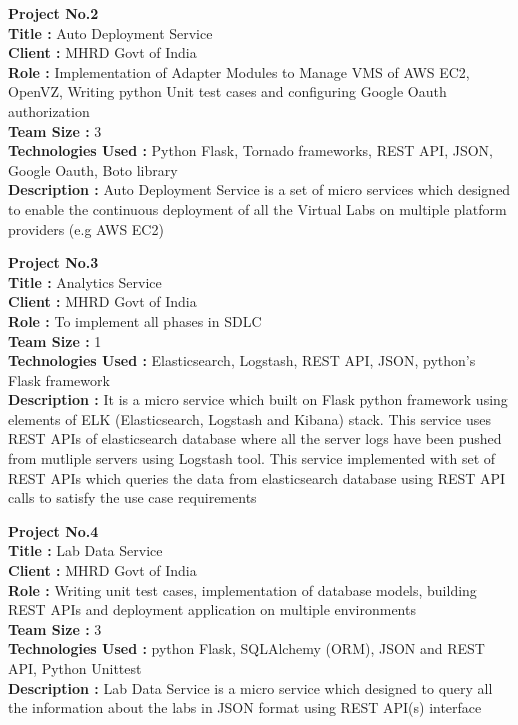 \documentclass{resume} %
\begin{document}
\bigskip

\textbf {Project No.2} \\
\textbf{Title : } Auto Deployment Service \\
\textbf{Client : } MHRD Govt of India \\
\textbf{Role : } Implementation of Adapter Modules to Manage
VMS of AWS EC2, OpenVZ, Writing python Unit test cases and
configuring Google Oauth authorization \\
\textbf{Team Size : } 3 \\
\textbf{Technologies Used :} Python Flask, Tornado
frameworks, REST API, JSON, Google Oauth, Boto library \\
\textbf{Description :} Auto Deployment Service is a set
of micro services which designed to enable the continuous
deployment of all the Virtual Labs on multiple platform
providers (e.g AWS EC2)



\bigskip

\textbf {Project No.3} \\
\textbf{Title : } Analytics Service \\
\textbf{Client : } MHRD Govt of India \\
\textbf{Role : } To implement all phases in SDLC  \\
\textbf{Team Size : } 1 \\
\textbf{Technologies Used :} Elasticsearch, Logstash, REST API, JSON, python's Flask
framework \\
\textbf{Description :} It is a
micro service which built on Flask python framework using
elements of ELK (Elasticsearch, Logstash and Kibana)
stack. This service uses REST APIs of elasticsearch database
where all the server logs have been pushed from mutliple
servers using Logstash tool. This service implemented
with set of REST APIs which queries the data from
elasticsearch database using REST API calls to satisfy the
use case requirements


\bigskip

\textbf {Project No.4} \\
\textbf{Title : }  Lab Data Service \\
\textbf{Client : } MHRD Govt of India \\
\textbf{Role : } Writing unit test cases, implementation of
database models, building REST APIs and deployment
application on multiple environments \\
\textbf{Team Size : } 3 \\
\textbf{Technologies Used :} python Flask, SQLAlchemy (ORM), JSON and REST API, Python Unittest \\
\textbf{Description :} Lab Data
Service is a micro service which designed to query all
the information about the labs in JSON format using REST
API(s) interface
\end{document}
